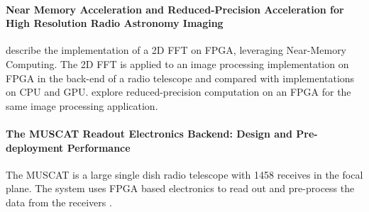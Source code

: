 \paragraph{Near Memory Acceleration and Reduced-Precision Acceleration for High Resolution Radio Astronomy Imaging}
\citet{Corda2020NearImaging} describe the implementation of a 2D FFT on FPGA, leveraging Near-Memory Computing. The 2D FFT is applied to an image processing implementation on FPGA in the back-end of a radio telescope and compared with implementations on CPU and GPU. \citet{Corda2022Reduced-PrecisionHardware} explore %
reduced-precision computation on an FPGA %
for the same image processing application. %

\paragraph{The MUSCAT Readout Electronics Backend: Design and Pre-deployment Performance}
The MUSCAT is a large single dish radio telescope with 1458 receives in the focal plane. The system uses FPGA based electronics to read out and pre-process the data from the receivers \cite{Rowe2023ThePerformance}. %


